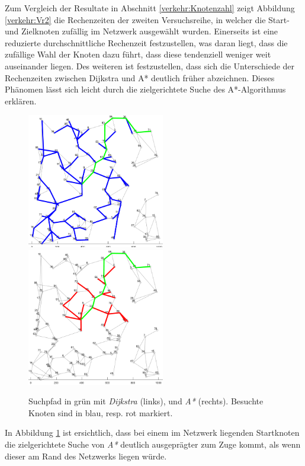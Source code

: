 Zum Vergleich der Resultate in Abschnitt \ref{verkehr:Knotenzahl} zeigt Abbildung \ref{verkehr:Vr2} die Rechenzeiten der zweiten Versuchsreihe, in welcher die Start- und Zielknoten zufällig im Netzwerk ausgewählt wurden. Einerseits ist eine reduzierte durchschnittliche Rechenzeit festzustellen, was daran liegt, dass die zufällige Wahl der Knoten dazu führt, dass diese tendenziell weniger weit auseinander liegen.
Des weiteren ist festzustellen, dass sich die Unterschiede der Rechenzeiten zwischen Dijkstra und A* deutlich früher abzeichnen. Dieses Phänomen lässt sich leicht durch die zielgerichtete Suche des A*-Algorithmus erklären.

\begin{figure}
\centering
\includegraphics[width=6cm]{papers/verkehr/figures/network_dij.png}\qquad
\includegraphics[width=6cm]{papers/verkehr/figures/network_aStar.png}
\caption{Suchpfad in grün mit \emph{Dijkstra} (links), und \emph{A*} (rechts). Besuchte Knoten sind in blau, resp. rot markiert.}
\label{verkehr:Comparison}
\end{figure}

In Abbildung \ref{verkehr:Comparison} ist ersichtlich, dass bei einem im Netzwerk liegenden Startknoten die zielgerichtete Suche von \emph{A*} deutlich ausgeprägter zum Zuge kommt, als wenn dieser am Rand des Netzwerks liegen würde.
